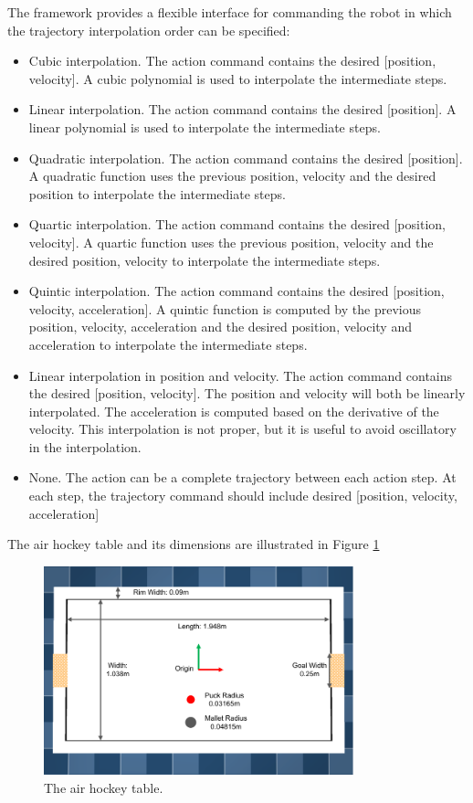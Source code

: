 
    The framework provides a flexible interface for commanding the robot in which the trajectory interpolation order can be specified:
    \begin{itemize}
        \item Cubic interpolation. The action command contains the desired [position, velocity]. A cubic polynomial is used to interpolate the intermediate steps.
        \item Linear interpolation. The action command contains the desired [position]. A linear polynomial is used to interpolate the intermediate steps.
        \item Quadratic interpolation. The action command contains the desired [position]. A quadratic function uses the previous position, velocity and the desired position to interpolate the intermediate steps.
        \item Quartic interpolation. The action command contains the desired [position, velocity]. A quartic function uses the previous position, velocity and the desired position, velocity to interpolate the intermediate steps.
        \item Quintic interpolation. The action command contains the desired [position, velocity, acceleration]. A quintic function is computed by the previous position, velocity, acceleration and the desired position, velocity and acceleration to interpolate the intermediate steps.
        \item Linear interpolation in position and velocity. The action command contains the desired [position, velocity]. The position and velocity will both be linearly interpolated. The acceleration is computed based on the derivative of the velocity. This interpolation is not proper, but it is useful to avoid oscillatory in the interpolation.
        \item None. The action can be a complete trajectory between each action step. At each step, the trajectory command should include desired [position, velocity, acceleration]
    \end{itemize}

    The air hockey table and its dimensions are illustrated in Figure \ref{fig:air_hockey_table}


    \begin{figure}[H]
        \centering
        \includegraphics[width=0.8\textwidth]{Images/air_hockey_table}
        \caption{The air hockey table.}
        \label{fig:air_hockey_table}
    \end{figure}

